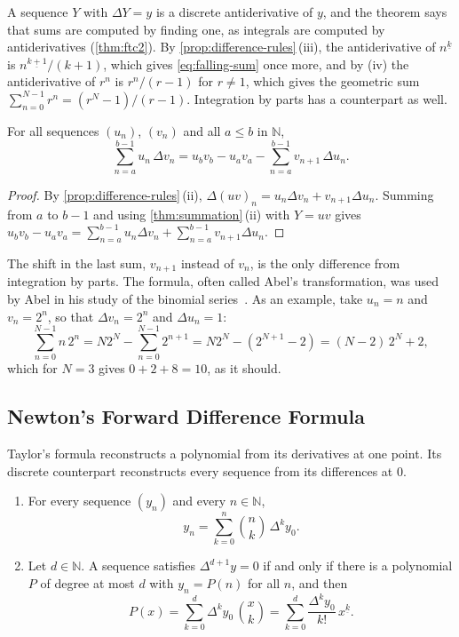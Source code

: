 A sequence $Y$ with $\Delta Y=y$ is a discrete antiderivative of $y$, and the theorem says that sums are computed by finding one, as integrals are computed by antiderivatives (\cref{thm:ftc2}). By \cref{prop:difference-rules}\,(iii), the antiderivative of $n^{\underline k}$ is $n^{\underline{k+1}}/(k+1)$, which gives \eqref{eq:falling-sum} once more, and by (iv) the antiderivative of $r^n$ is $r^n/(r-1)$ for $r\ne1$, which gives the geometric sum $\sum_{n=0}^{N-1}r^n=(r^N-1)/(r-1)$. Integration by parts has a counterpart as well.

\begin{proposition}
\label{prop:summation-by-parts}
For all sequences $(u_n)$, $(v_n)$ and all $a\le b$ in $\mathbb N$,
\[
\sum_{n=a}^{b-1}u_n\,\Delta v_n=u_bv_b-u_av_a-\sum_{n=a}^{b-1}v_{n+1}\,\Delta u_n .
\]
\end{proposition}

\begin{proof}
By \cref{prop:difference-rules}\,(ii), $\Delta(uv)_n=u_n\Delta v_n+v_{n+1}\Delta u_n$. Summing from $a$ to $b-1$ and using \cref{thm:summation}\,(ii) with $Y=uv$ gives $u_bv_b-u_av_a=\sum_{n=a}^{b-1}u_n\Delta v_n+\sum_{n=a}^{b-1}v_{n+1}\Delta u_n$.
\end{proof}

The shift in the last sum, $v_{n+1}$ instead of $v_n$, is the only difference from integration by parts. The formula, often called Abel's transformation, was used by Abel in his study of the binomial series~\cite{abel1826}. As an example, take $u_n=n$ and $v_n=2^n$, so that $\Delta v_n=2^n$ and $\Delta u_n=1$:
\[
\sum_{n=0}^{N-1}n\,2^n=N2^N-\sum_{n=0}^{N-1}2^{n+1}=N2^N-(2^{N+1}-2)=(N-2)\,2^N+2,
\]
which for $N=3$ gives $0+2+8=10$, as it should.

\subsection{Newton's Forward Difference Formula}

Taylor's formula reconstructs a polynomial from its derivatives at one point. Its discrete counterpart reconstructs every sequence from its differences at $0$.

\begin{theorem}
\label{thm:newton-forward}
\leavevmode
\begin{enumerate}
\item For every sequence $(y_n)$ and every $n\in\mathbb N$,
\[
y_n=\sum_{k=0}^n\binom nk\,\Delta^ky_0 .
\]
\item Let $d\in\mathbb N$. A sequence satisfies $\Delta^{d+1}y=0$ if and only if there is a polynomial $P$ of degree at most $d$ with $y_n=P(n)$ for all $n$, and then
\[
P(x)=\sum_{k=0}^d\Delta^ky_0\,\binom xk=\sum_{k=0}^d\frac{\Delta^ky_0}{k!}\,x^{\underline k} .
\]
\end{enumerate}
\end{theorem}

